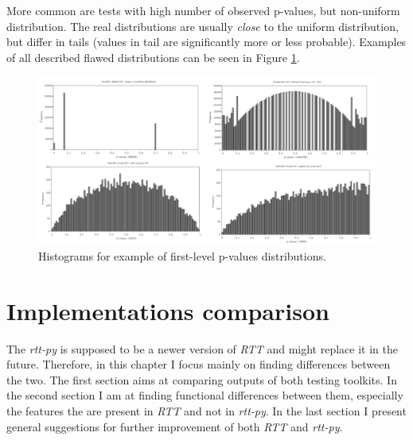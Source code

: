 \documentclass[
  digital,     %
  oneside,     %
  nosansbold,  %
  nocolorbold, %
  nolof,         %
  nolot,         %
]{fithesis4}
\begin{document}
More common are tests with high number of observed p-values, but non-uniform distribution. The real distributions are usually \emph{close} to the uniform distribution, but differ in tails (values in tail are significantly more or less probable). Examples of all described flawed distributions can be seen in Figure \ref{fig:uniforms}.

\begin{figure}
  \begin{center}
    \includegraphics[width=13cm]{figures/uniformity.png}
  \end{center}
  \caption{Histograms for example of first-level p-values distributions.}
  \label{fig:uniforms}
\end{figure}

\chapter{Implementations comparison}

The \emph{rtt-py} is supposed to be a newer version of \emph{RTT} and might replace it in the future. Therefore, in this chapter I focus mainly on finding differences between the two. The first section aims at comparing outputs of both testing toolkits. In the second section I am at finding functional differences between them, especially the features the are present in \emph{RTT} and not in \emph{rtt-py}. In the last section I present general suggestions for further improvement of both \emph{RTT} and \emph{rtt-py}. 

\end{document}
